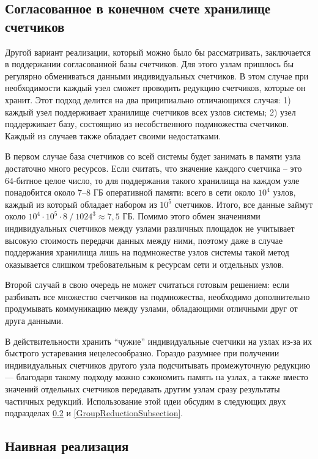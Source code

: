\documentclass{article}
\theoremstyle{plain}
\theoremstyle{plain}
\theoremstyle{plain}
\theoremstyle{plain}
\theoremstyle{definition}
\theoremstyle{remark}
\theoremstyle{plain}
\begin{document}
\subsection{Согласованное в конечном счете хранилище счетчиков}
\label{EventuallyConsistentMathodSubsection}

Другой вариант реализации, который можно было бы рассматривать, заключается в поддержании согласованной базы счетчиков. Для этого узлам пришлось бы регулярно обмениваться данными индивидуальных счетчиков. В этом случае при необходимости каждый узел сможет проводить редукцию счетчиков, которые он хранит. Этот подход делится на два приципиально отличающихся случая: 1) каждый узел поддерживает хранилище счетчиков всех узлов системы; 2) узел поддерживает базу, состоящию из несобственного подмножества счетчиков. Каждый из случаев также обладает своими недостатками.

В первом случае база счетчиков со всей системы будет занимать в памяти узла достаточно много ресурсов. Если считать, что значение каждого счетчика -- это 64-битное целое число, то для поддержания такого хранилища на каждом узле понадобится около 7--8 ГБ оперативной памяти: всего в сети около $10^4$ узлов, каждый из который обладает набором из $10^5$ счетчиков. Итого, все данные займут около $10^4 \cdot 10^5 \cdot 8\ /\ 1024^3 \approx 7,5$ ГБ. Помимо этого обмен значениями индивидуальных счетчиков между узлами различных площадок не учитывает высокую стоимость передачи данных между ними, поэтому даже в случае поддержания хранилища лишь на подмножестве узлов системы такой метод оказывается слишком требовательным к ресурсам сети и отдельных узлов.

Второй случай в свою очередь не может считаться готовым решением: если разбивать все множество счетчиков на подмножества, необходимо дополнительно продумывать коммуникацию между узлами, обладающими отличными друг от друга данными.

В действительности хранить \enquote{чужие} индивидуальные счетчики на узлах из-за их быстрого устаревания нецелесообразно. Гораздо разумнее при получении индивидуальных счетчиков другого узла подсчитывать промежуточную редукцию --- благодаря такому подходу можно сэкономить память на узлах, а также вместо значений отдельных счетчиков передавать другим узлам сразу результаты частичных редукций. Использование этой идеи обсудим в следующих двух подразделах \ref{NaiveImplementationSubsection} и \ref{GroupReductionSubsection}.

\subsection{Наивная реализация}
\label{NaiveImplementationSubsection}
\end{document}
